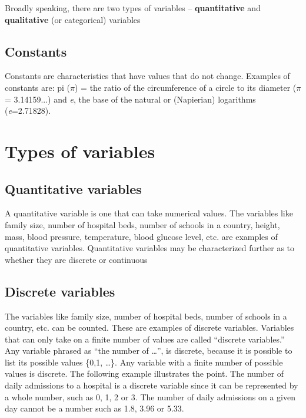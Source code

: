 \documentclass[
]{book}
\begin{document}
Broadly speaking, there are two types of variables -- \textbf{quantitative}
and \textbf{qualitative} (or categorical) variables

\hypertarget{constants}{%
\subsection{Constants}\label{constants}}

Constants are characteristics that have values that do not change.
Examples of constants are: pi (\(\pi\)) = the ratio of the circumference of a
circle to its diameter (\(\pi\) = 3.14159...) and \emph{e}, the base of the
natural or (Napierian) logarithms (\emph{e}=2.71828).

\hypertarget{types-of-variables}{%
\section{Types of variables}\label{types-of-variables}}

\hypertarget{quantitative-variables}{%
\subsection{Quantitative variables}\label{quantitative-variables}}

A quantitative variable is one that can take numerical values. The
variables like family size, number of hospital beds, number of schools
in a country, height, mass, blood pressure, temperature, blood glucose
level, etc. are examples of quantitative variables. Quantitative
variables may be characterized further as to whether they are discrete
or continuous

\hypertarget{discrete-variables}{%
\subsection{Discrete variables}\label{discrete-variables}}

The variables like family size, number of hospital beds, number of
schools in a country, etc. can be counted. These are examples of
discrete variables. Variables that can only take on a finite number of
values are called ``discrete variables.'' Any variable phrased as ``the
number of \ldots{}'', is discrete, because it is possible to list its possible
values \{0,1, \ldots\}. Any variable with a finite number of possible values
is discrete. The following example illustrates the point. The number of
daily admissions to a hospital is a discrete variable since it can be
represented by a whole number, such as 0, 1, 2 or 3. The number of daily
admissions on a given day cannot be a number such as 1.8, 3.96 or 5.33.
\end{document}
